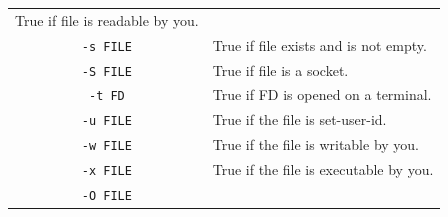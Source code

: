 \documentclass[doctor,openright,twoside]{sjtuthesis}
\newcommand{\passthrough}[1]{#1}
\theoremstyle{plain}
\theoremstyle{definition}
\theoremstyle{remark}
\theoremstyle{ocrenumbox}
\theoremstyle{plain}
\begin{document}
\begin{longtable}[]{@{}cl@{}}
\begin{minipage}[t]{0.74\columnwidth}
True if file is readable by you.\strut
\end{minipage}\tabularnewline
\begin{minipage}[t]{0.20\columnwidth}\centering
\passthrough{\lstinline!-s FILE!}\strut
\end{minipage} & \begin{minipage}[t]{0.74\columnwidth}\raggedright
True if file exists and is not empty.\strut
\end{minipage}\tabularnewline
\begin{minipage}[t]{0.20\columnwidth}\centering
\passthrough{\lstinline!-S FILE!}\strut
\end{minipage} & \begin{minipage}[t]{0.74\columnwidth}\raggedright
True if file is a socket.\strut
\end{minipage}\tabularnewline
\begin{minipage}[t]{0.20\columnwidth}\centering
\passthrough{\lstinline!-t FD!}\strut
\end{minipage} & \begin{minipage}[t]{0.74\columnwidth}\raggedright
True if FD is opened on a terminal.\strut
\end{minipage}\tabularnewline
\begin{minipage}[t]{0.20\columnwidth}\centering
\passthrough{\lstinline!-u FILE!}\strut
\end{minipage} & \begin{minipage}[t]{0.74\columnwidth}\raggedright
True if the file is set-user-id.\strut
\end{minipage}\tabularnewline
\begin{minipage}[t]{0.20\columnwidth}\centering
\passthrough{\lstinline!-w FILE!}\strut
\end{minipage} & \begin{minipage}[t]{0.74\columnwidth}\raggedright
True if the file is writable by you.\strut
\end{minipage}\tabularnewline
\begin{minipage}[t]{0.20\columnwidth}\centering
\passthrough{\lstinline!-x FILE!}\strut
\end{minipage} & \begin{minipage}[t]{0.74\columnwidth}\raggedright
True if the file is executable by you.\strut
\end{minipage}\tabularnewline
\begin{minipage}[t]{0.20\columnwidth}\centering
\passthrough{\lstinline!-O FILE!}\strut
\end{minipage} & \begin{minipage}[t]{0.74\columnwidth}\raggedright

\end{minipage}
\end{longtable}
\end{document}
